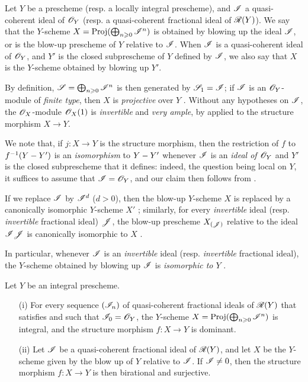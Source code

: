 \begin{definition}[8.1.3]
\label{II.8.1.3}
Let $Y$ be a prescheme (resp. a locally integral prescheme), and $\mathscr{I}$ a quasi-coherent ideal of $\mathscr{O}_Y$ (resp. a quasi-coherent fractional ideal of $\mathscr{R}(Y)$).
We say that the $Y$-scheme $X = \operatorname{Proj}(\bigoplus_{n\geqslant0}\mathscr{I}^n)$ is obtained by blowing up the ideal $\mathscr{I}$, or is the blow-up prescheme of $Y$ relative to $\mathscr{I}$.
When $\mathscr{I}$ is a quasi-coherent ideal of $\mathscr{O}_Y$, and $Y'$ is the closed subprescheme of $Y$ defined by $\mathscr{I}$, we also say that $X$ is the $Y$-scheme obtained by blowing up $Y'$.
\end{definition}

By definition, $\mathscr{S} = \bigoplus_{n\geqslant0}\mathscr{I}^n$ is then generated by $\mathscr{S}_1 = \mathscr{I}$;
if $\mathscr{I}$ is an $\mathscr{O}_Y$-module of \emph{finite type}, then $X$ is \emph{projective} over $Y$ .
Without any hypotheses on $\mathscr{I}$, the $\mathscr{O}_X$-module $\mathscr{O}_X(1)$ is \emph{invertible}  and \emph{very ample}, by  applied to the structure morphism $X\to Y$.

We note that, if $j:X\to Y$ is the structure morphism, then the restriction of $f$ to $f^{-1}(Y- Y')$ is an \emph{isomorphism} to $Y- Y'$ whenever $\mathscr{I}$ is an \emph{ideal of $\mathscr{O}_Y$} and $Y'$ is the closed subprescheme that it defines: indeed, the question being local on $Y$, it suffices to assume that $\mathscr{I} = \mathscr{O}_Y$, and our claim then follows from .

If we replace $\mathscr{I}$ by $\mathscr{I}^d$ ($d>0$), then the blow-up $Y$-scheme $X$ is replaced by a canonically isomorphic $Y$-scheme $X'$ ;
similarly, for every \emph{invertible} ideal (resp. \emph{invertible} fractional ideal) $\mathscr{J}$, the blow-up prescheme $X_{(\mathscr{J})}$ relative to the ideal $\mathscr{I}\mathscr{J}$ is canonically isomorphic to $X$ .

In particular, whenever $\mathscr{I}$ is an \emph{invertible} ideal (resp. \emph{invertible} fractional ideal), the $Y$-scheme obtained by blowing up $\mathscr{I}$ is \emph{isomorphic to $Y$} .

\begin{proposition}[8.1.3]
\label{II.8.1.4}
Let $Y$ be an integral prescheme.
\begin{enumerate}
    \item[\rm{(i)}] For every sequence $(\mathscr{I}_n)$ of quasi-coherent fractional ideals of $\mathscr{R}(Y)$ that satisfies 
        and such that $\mathscr{I}_0 = \mathscr{O}_Y$, the $Y$-scheme $X=\operatorname{Proj}(\bigoplus_{n\geqslant0}\mathscr{I}^n)$ is integral, and the structure morphism $f:X\to Y$ is dominant.
    \item[\rm{(ii)}] Let $\mathscr{I}$ be a quasi-coherent fractional ideal of $\mathscr{R}(Y)$, and let $X$ be the $Y$-scheme given by the blow up of $Y$ relative to $\mathscr{I}$.
        If $\mathscr{I} \neq 0$, then the structure morphism $f:X\to Y$ is then birational and surjective.
\end{enumerate}
\end{proposition}

